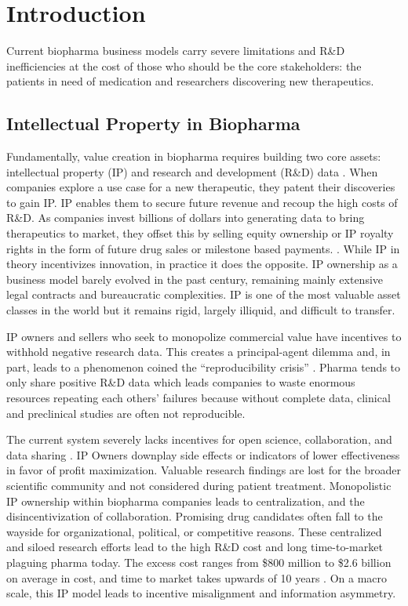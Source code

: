 \documentclass[12pt,letterpaper]{article}
\begin{document}
\newpage
\renewcommand{\contentsname}{\centering Table of Contents}

\tableofcontents

\newpage

\section{Introduction}
Current biopharma business models carry severe limitations and R\&D inefficiencies at the cost of those who should be the core stakeholders: the patients in need of medication and researchers discovering new therapeutics.

\subsection{Intellectual Property in Biopharma}
Fundamentally, value creation in biopharma requires building two core assets: intellectual property (IP) and research and development (R\&D) data \citep{Chandra2011}. When companies explore a use case for a new therapeutic, they patent their discoveries to gain IP. IP enables them to secure future revenue and recoup the high costs of R\&D. As companies invest billions of dollars into generating data to bring therapeutics to market, they offset this by selling equity ownership or IP royalty rights in the form of future drug sales or milestone based payments. \citep{Wouters2020}. While IP in theory incentivizes innovation, in practice it does the opposite. IP ownership as a business model barely evolved in the past century, remaining mainly extensive legal contracts and bureaucratic complexities. IP is one of the most valuable asset classes in the world but it remains rigid, largely illiquid, and difficult to transfer.

IP owners and sellers who seek to monopolize commercial value have incentives to withhold negative research data. This creates a principal-agent dilemma and, in part, leads to a phenomenon coined the “reproducibility crisis” \citep{Sherkow2017}. Pharma tends to only share positive R\&D data which leads companies to waste enormous resources repeating each others’ failures because without complete data, clinical and preclinical studies are often not reproducible. 

The current system severely lacks incentives for open science, collaboration, and data sharing \citep{Ali-Khan2017}. IP Owners downplay side effects or indicators of lower effectiveness in favor of profit maximization. Valuable research findings are lost for the broader scientific community and not considered during patient treatment. Monopolistic IP ownership within biopharma companies leads to centralization, and the disincentivization of collaboration. Promising drug candidates often fall to the wayside for organizational, political, or competitive reasons. These centralized and siloed research efforts lead to the high R\&D cost and long time-to-market plaguing pharma today. The excess cost ranges from \$800 million to \$2.6 billion on average in cost, and time to market takes upwards of 10 years \citep{DiMasi2016}. On a macro scale, this IP model leads to incentive misalignment and information asymmetry. 
\end{document}
